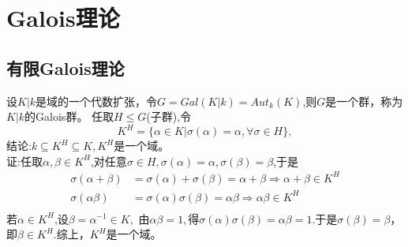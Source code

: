 \documentclass[UTF8]{article}
\begin{document}
\section{Galois理论}
\subsection{有限Galois理论}
设$K|k$是域的一个代数扩张，令$G=Gal(K|k)=Aut_{k}(K)$,则$G$是一个群，称为$K|k$的Galois群。
任取$H\leq G$(子群),令
$$K^{H}=\{\alpha \in K|\sigma(\alpha)=\alpha,\forall \sigma \in H\},$$
结论:$k\subseteq K^{H}\subseteq K,K^{H}$是一个域。\\
证:任取$\alpha,\beta\in K^{H}$,对任意$\sigma \in H,\sigma(\alpha)=\alpha,\sigma(\beta)=\beta$,于是
\[
\begin{split}
\sigma(\alpha+\beta)&=\sigma(\alpha)+\sigma(\beta)=\alpha+\beta\Longrightarrow \alpha+\beta\in K^{H} \\
\sigma(\alpha\beta)&=\sigma(\alpha)\sigma(\beta)=\alpha\beta\Longrightarrow \alpha\beta \in K^{H}\\
\end{split}
\]
若$\alpha\in K^{H}$,设$\beta=\alpha^{-1}\in K,$
由$\alpha\beta=1,$得$\sigma(\alpha)\sigma(\beta)=\alpha\beta=1$.于是$\sigma(\beta)=\beta$，即$\beta\in K^{H}.$综上，$K^{H}$是一个域。\\
\end{document}
